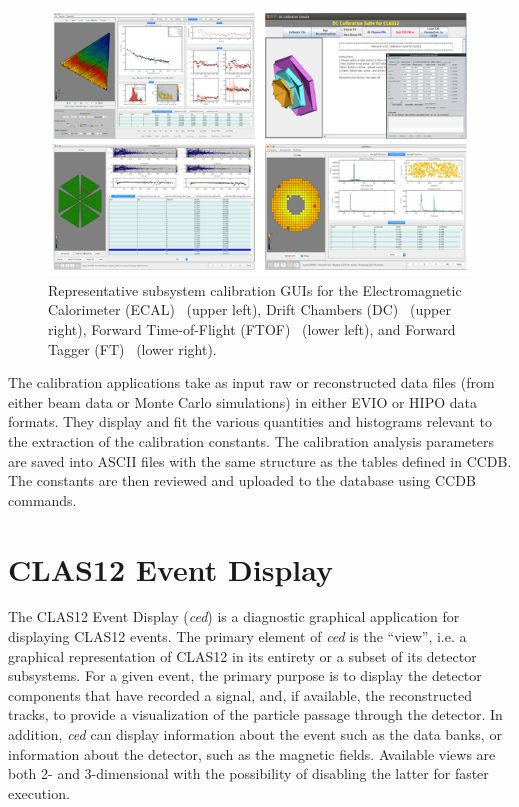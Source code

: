 \begin{figure}
\centering
\includegraphics[width=2.0\columnwidth]{pics/suites.png}
\caption{Representative subsystem calibration GUIs for the Electromagnetic Calorimeter (ECAL)~\cite{ecal-nim}
  (upper left), Drift Chambers (DC)~\cite{dc-nim} (upper right), Forward Time-of-Flight (FTOF)~\cite{ftof-nim}
  (lower left),  and Forward Tagger (FT)~\cite{ft-nim} (lower right).}
\label{suites}
\end{figure}

The calibration applications take as input raw or reconstructed data files (from either beam data or Monte Carlo
simulations) in either EVIO or HIPO data formats.  They display and fit the various quantities and histograms
relevant to the extraction of the calibration constants.  The calibration analysis parameters are saved into ASCII
files with the same structure as the tables defined in CCDB.  The constants are then reviewed and uploaded to the
database using CCDB commands.

\section{CLAS12 Event Display}
\label{sec:ced}

The CLAS12 Event Display ({\it ced}) is a diagnostic graphical application for displaying CLAS12 events. The
primary element of {\it ced} is the ``view'', i.e. a graphical representation of CLAS12 in its entirety or a subset of
its detector subsystems. For a given event, the primary purpose is to display the detector components that have
recorded a signal, and, if available, the reconstructed tracks, to provide a visualization of the particle passage
through the detector. In addition, {\it ced} can display information about the event such as the data banks, or
information about the detector, such as the magnetic fields. Available views are both 2- and 3-dimensional with
the possibility of disabling the latter for faster execution.

